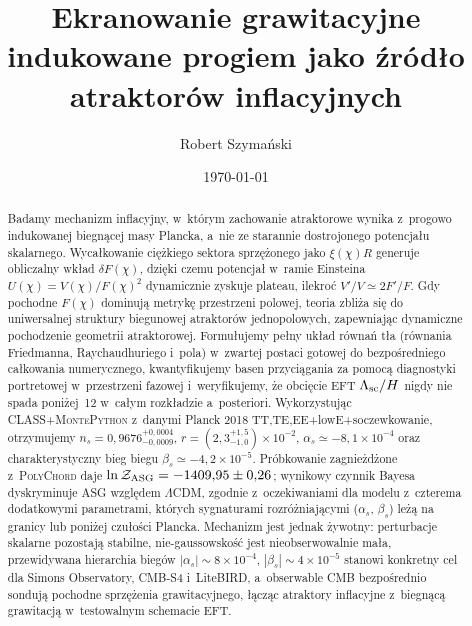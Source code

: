 \documentclass[11pt,a4paper]{article}
\title{Ekranowanie grawitacyjne indukowane progiem jako źródło atraktorów inflacyjnych}
\author{Robert Szyma\'nski}
\date{\today}
\begin{document}
\maketitle

\begin{abstract}
Badamy mechanizm inflacyjny, w~którym zachowanie atraktorowe wynika z~progowo indukowanej biegnącej masy Plancka, a~nie ze starannie dostrojonego potencjału skalarnego. Wycałkowanie ciężkiego sektora sprzężonego jako $\xi(\chi) R$ generuje obliczalny wkład $\delta F(\chi)$, dzięki czemu potencjał w~ramie Einsteina $U(\chi)=V(\chi)/F(\chi)^2$ dynamicznie zyskuje plateau, ilekroć $V'/V\simeq2F'/F$. Gdy pochodne $F(\chi)$ dominują metrykę przestrzeni polowej, teoria zbliża się do uniwersalnej struktury biegunowej atraktorów jednopolowych, zapewniając dynamiczne pochodzenie geometrii atraktorowej. Formułujemy pełny układ równań tła (równania Friedmanna, Raychaudhuriego i~pola) w~zwartej postaci gotowej do bezpośredniego całkowania numerycznego, kwantyfikujemy basen przyciągania za pomocą diagnostyki portretowej w~przestrzeni fazowej i~weryfikujemy, że obcięcie EFT $\Lambda_{\rm sc}/H$ nigdy nie spada poniżej~12 w~całym rozkładzie a~posteriori. Wykorzystując \textsc{CLASS}+\textsc{MontePython} z~danymi Planck 2018 TT,TE,EE+lowE+soczewkowanie, otrzymujemy $n_s=0{,}9676^{+0{,}0004}_{-0{,}0009}$, $r=(2{,}3^{+1{,}5}_{-1{,}0})\times10^{-2}$, $\alpha_s\simeq-8{,}1\times10^{-4}$ oraz charakterystyczny bieg biegu $\beta_s\simeq-4{,}2\times10^{-5}$. Próbkowanie zagnieżdżone z~\textsc{PolyChord} daje $\ln\mathcal{Z}_{\rm ASG}=-1409{,}95\pm0{,}26$; wynikowy czynnik Bayesa dyskryminuje ASG względem $\Lambda$CDM, zgodnie z~oczekiwaniami dla modelu z~czterema dodatkowymi parametrami, których sygnaturami rozróżniającymi ($\alpha_s$, $\beta_s$) leżą na granicy lub poniżej czułości Plancka. Mechanizm jest jednak żywotny: perturbacje skalarne pozostają stabilne, nie-gaussowskość jest nieobserwowalnie mała, przewidywana hierarchia biegów $|\alpha_s|\sim8\times10^{-4}$, $|\beta_s|\sim4\times10^{-5}$ stanowi konkretny cel dla Simons Observatory, CMB-S4 i~LiteBIRD, a~obserwable CMB bezpośrednio sondują pochodne sprzężenia grawitacyjnego, łącząc atraktory inflacyjne z~biegnącą grawitacją w~testowalnym schemacie EFT.
\end{abstract}
\end{document}
